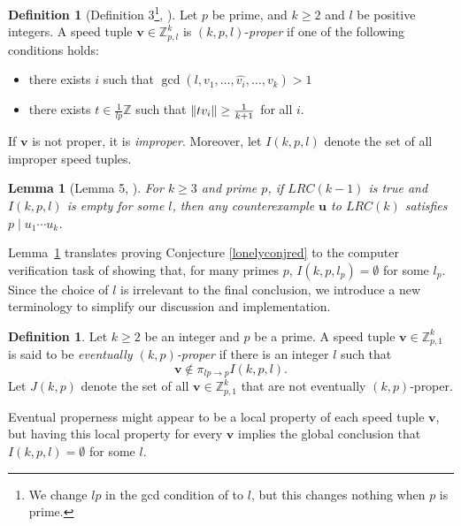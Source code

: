 \documentclass[11pt]{amsart}
\DeclarePairedDelimiter\norm{\lVert}{\rVert}
\newcommand{\Z}{\mathbb{Z}}
\newcommand{\vbf}{\mathbf{v}}
\newcommand{\ubf}{\mathbf{u}}
\newtheorem{lemma}[theorem]{Lemma}
\theoremstyle{definition}
\newtheorem{definition}[theorem]{Definition}
\theoremstyle{remark}
\begin{document}
\begin{definition}[Definition 3\footnote{We change $lp$ in the gcd condition of \cite{Trakulthongchai} to $l$,
  but this changes nothing when $p$ is prime.}, \cite{Trakulthongchai}]\label{def:improper}
    Let $p$ be prime, and $k \geq 2$ and $l$ be positive integers.
    A speed tuple $\vbf\in\Z_{p,l}^k$ is $(k,p,l)$-\emph{proper} if one of the following conditions holds: 
  \begin{itemize}
    \item there exists $i$ such that $\gcd(l, v_1, \dots, \widehat{v_{i}}, \dots, v_k) > 1$
    \item there exists $t \in\frac{1}{lp}\Z$ such that $\norm{tv_i} \geq \frac{1}{k+1}$ for all $i$.
  \end{itemize}
   If $\vbf$ is not proper, it is \emph{improper}. Moreover, let $I(k,p,l)$ denote the set of all improper speed tuples.
\end{definition}

\begin{lemma}[Lemma 5, \cite{Trakulthongchai}] \label{lem:divp}
    For $k\geq3$ and prime $p$, if $LRC(k-1)$ is true and $I(k,p,l)$ is empty for some $l$, then any counterexample
    $\ubf$ to $LRC(k)$ satisfies $p \mid u_1 \cdots u_k$. 
\end{lemma}

Lemma~\ref{lem:divp} translates proving Conjecture \ref{lonelyconjred} to the computer verification task
of showing that, for many primes $p$, $I(k,p,l_p)=\emptyset$ for some $l_p$.
Since the choice of $l$ is irrelevant to the final conclusion, 
we introduce a new terminology to simplify our discussion and implementation. 
\begin{definition}
  \label{def:eventualproper}
  Let $k \geq 2$ be an integer and $p$ be a prime. 
  A speed tuple $\vbf \in \Z_{p,1}^k$ is said to be \emph{eventually $(k,p)$-proper}
  if there is an integer $l$ such 
  that \[ \vbf \notin \pi_{lp \to p} I(k, p, l). \]
  Let $J(k,p)$ denote the set of all $\vbf \in \Z_{p,1}^k$ that are not eventually $(k,p)$-proper.
\end{definition}

Eventual properness might appear to be a local property of each speed tuple $\vbf$,
but having this local property for every $\vbf$ implies the global conclusion that $I(k,p,l)=\emptyset$ for some $l$.
\end{document}
